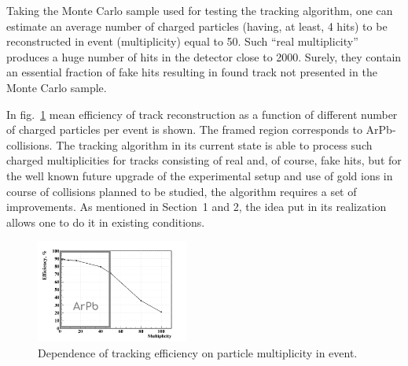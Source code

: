 \documentclass{webofc}
\begin{document}
Taking the Monte Carlo sample used for testing the tracking algorithm, one can estimate an average number of charged particles (having, at least, 4 hits) to be reconstructed in event (multiplicity)
equal to 50. Such ``real multiplicity'' produces a huge number of hits in the detector close to 2000. Surely, they contain an essential fraction of fake hits resulting in found track not presented
in the Monte Carlo sample. 

In fig.~\ref{fig-5} mean efficiency of track reconstruction as a function of different number of charged particles per event is shown. The framed region corresponds to ArPb-collisions.
The tracking algorithm in its current state is able to process such charged multiplicities for tracks consisting of real and, of course, fake hits, but for the well known future upgrade of the experimental
setup and use of gold ions in course of collisions planned to be studied, the algorithm requires a set of improvements. As mentioned in Section~1 and 2, the idea put in its realization allows one
to do it in existing conditions.
\begin{figure}[h]
	\centering
	\includegraphics[width=5cm,clip]{eff_vs_mult_box_ArPb}
	\caption{Dependence of tracking efficiency on particle multiplicity in event.}
	\label{fig-5}
\end{figure}
\end{document}
